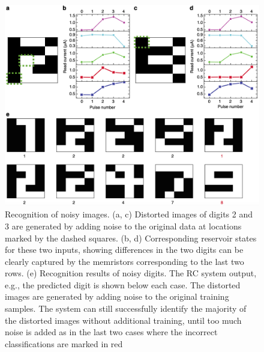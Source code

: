 \documentclass[11pt, oneside]{article}
\begin{document}
\begin{figure}[H]
    \centering
    \includegraphics[width=\textwidth]{figs/reservoir-memristor-3.png}

    \caption{Recognition of noisy images. (a, c) Distorted images of digits 2 and 3 are generated by adding noise to the original data at locations marked by the dashed squares. (b, d) Corresponding reservoir states for these two inputs, showing differences in the two digits can be clearly captured by the memristors corresponding to the last two rows. (e) Recognition results of noisy digits. The RC system output, e.g., the predicted digit is shown below each case. The distorted images are generated by adding noise to the original training samples. The system can still successfully identify the majority of the distorted images without additional training, until too much noise is added as in the last two cases where the incorrect classifications are marked in red}
\end{figure}
\end{document}
